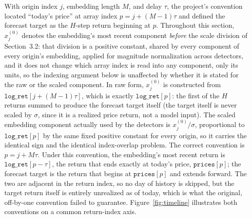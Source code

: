 \documentclass[preprint,12pt]{elsarticle}
\begin{document}
With origin index $j$, embedding length $M$, and delay $\tau$, the project's
convention located ``today's price'' at array index $p = j + (M-1)\tau$ and defined the
forecast target as the $H$-step return beginning at $p$. Throughout this section, $x_j^{(0)}$
denotes the embedding's most recent component \emph{before} the scale division of
Section~3.2: that division is a positive constant, shared by every component of every origin's
embedding, applied for magnitude normalization across detectors, and it does not change which
array index is read into any component, only its units, so the indexing argument below is
unaffected by whether it is stated for the raw or the scaled component. In raw form, $x_j^{(0)}$
is constructed from $\texttt{log\_ret}[j + (M-1)\tau]$, which is
exactly $\texttt{log\_ret}[p]$: the first of the $H$ returns summed to produce the forecast
target itself (the target itself is never scaled by $\sigma$, since it is a realized price
return, not a model input). The scaled embedding component actually used by the detectors is
$x_j^{(0)}/\sigma$, proportional to $\texttt{log\_ret}[p]$ by the same fixed positive constant
for every origin, so it carries the identical sign and the identical index-overlap problem. The correct convention is $p = j + M\tau$. Under this convention, the
embedding's most recent return is $\texttt{log\_ret}[p-\tau]$, the return that ends exactly at
today's price, $\texttt{prices}[p]$; the forecast target is the return that begins at
$\texttt{prices}[p]$ and extends forward. The two are adjacent in the return index, so no day
of history is skipped, but the target return itself is entirely unrealized as of today, which
is what the original, off-by-one convention failed to guarantee. Figure~\ref{fig:timeline}
illustrates both conventions on a common return-index axis.
\end{document}
